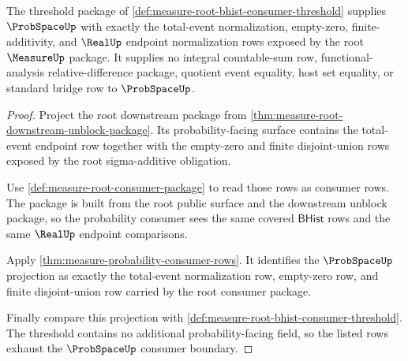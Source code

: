 \begin{theorem}
\label{thm:measure-root-bhist-probspace-threshold}
The threshold package of
\autoref{def:measure-root-bhist-consumer-threshold} supplies $\ProbSpaceUp$
with exactly the total-event normalization, empty-zero, finite-additivity, and
$\RealUp$ endpoint normalization rows exposed by the root $\MeasureUp$
package. It supplies no integral countable-sum row, functional-analysis
relative-difference package, quotient event equality, host set equality, or
standard bridge row to $\ProbSpaceUp$.
\end{theorem}
\begin{proof}
Project the root downstream package from
\autoref{thm:measure-root-downstream-unblock-package}. Its probability-facing
surface contains the total-event endpoint row together with the empty-zero and
finite disjoint-union rows exposed by the root sigma-additive obligation.

Use \autoref{def:measure-root-consumer-package} to read those rows as consumer
rows. The package is built from the root public surface and the downstream
unblock package, so the probability consumer sees the same covered
$\mathsf{BHist}$ rows and the same $\RealUp$ endpoint comparisons.

Apply \autoref{thm:measure-probability-consumer-rows}. It identifies the
$\ProbSpaceUp$ projection as exactly the total-event normalization row,
empty-zero row, and finite disjoint-union row carried by the root consumer
package.

Finally compare this projection with
\autoref{def:measure-root-bhist-consumer-threshold}. The threshold contains no
additional probability-facing field, so the listed rows exhaust the
$\ProbSpaceUp$ consumer boundary.
\end{proof}

